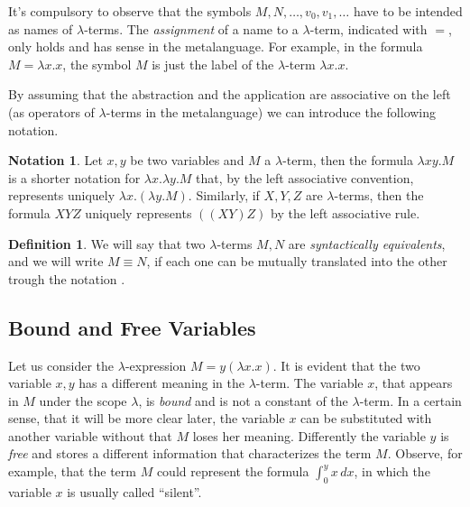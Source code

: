 \documentclass[a4paper,11pt]{article}
\theoremstyle{definition}
\newtheorem{defn}{Definition}
\newtheorem{notation}{Notation}
\begin{document}
It's compulsory to observe that the symbols $M,N,\dots, v_0, v_1,\dots$ have
to be intended as names of $\lambda$-terms. The \textit{assignment} of a name
to a $\lambda$-term, indicated with $=$, only holds and has sense in the metalanguage. 
For example, in the formula $M=\lambda x.x$, the symbol $M$ is just the label 
of the $\lambda$-term $\lambda x.x$.

By assuming that the abstraction and the application are associative on the
left (as operators of $\lambda$-terms in the metalanguage) we can introduce
the following notation.
\begin{notation}
  \label{not:left}
  Let $x,y$ be two variables and $M$ a $\lambda$-term, then the formula
  $\lambda xy.M$ is a shorter notation for $\lambda x.\lambda y. M$ that, by
  the left associative convention, represents uniquely $\lambda x.(\lambda y.M)$.
  Similarly, if $X,Y,Z$ are $\lambda$-terms, then the formula $XYZ$ uniquely
  represents $((XY)Z)$ by the left associative rule.
\end{notation}

\begin{defn}
  We will say that two $\lambda$-terms $M,N$ are \textit{syntactically
  equivalents}, and we will write $M\equiv N$, if each one can be mutually
  translated into the other trough the notation .
\end{defn}
\subsection{Bound and Free Variables}
Let us consider the $\lambda$-expression $M=y(\lambda x.x)$. It is evident that
the two variable $x,y$ has a different meaning in the $\lambda$-term. The variable $x$, that 
appears in $M$ under the scope $\lambda$, is \textit{bound} and is not a constant of the 
$\lambda$-term. In a certain sense, that it will be more clear later, the
variable $x$ can be substituted with another variable without that $M$ loses
her meaning. Differently the variable $y$ is \textit{free} and stores a different information that
characterizes the term $M$. Observe, for example, that the term $M$ could represent the
formula $\int_0^y x\,dx$, in which the variable $x$ is usually called ``silent''.
\end{document}
